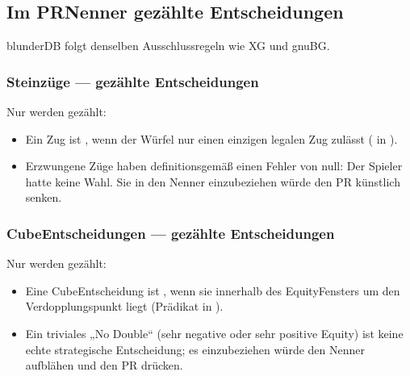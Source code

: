 \documentclass[letterpaper,10pt,german]{sphinxmanual}
\begin{document}
\subsection{Im PR\sphinxhyphen{}Nenner gezählte Entscheidungen}
\label{\detokenize{stats_parity:decisions-comptees-au-denominateur-du-pr}}
\sphinxAtStartPar
blunderDB folgt denselben Ausschlussregeln wie XG und gnuBG.


\subsubsection{Steinzüge — gezählte Entscheidungen}
\label{\detokenize{stats_parity:coups-de-pions-decisions-comptees}}
\sphinxAtStartPar
Nur  werden gezählt:
\begin{itemize}
\item {} 
\sphinxAtStartPar
Ein Zug ist , wenn der Würfel nur einen einzigen legalen Zug zulässt ( in ).

\item {} 
\sphinxAtStartPar
Erzwungene Züge haben definitionsgemäß einen Fehler von null: Der Spieler hatte keine Wahl. Sie in den Nenner einzubeziehen würde den PR künstlich senken.

\end{itemize}


\subsubsection{Cube\sphinxhyphen{}Entscheidungen — gezählte Entscheidungen}
\label{\detokenize{stats_parity:decisions-de-cube-decisions-comptees}}
\sphinxAtStartPar
Nur  werden gezählt:
\begin{itemize}
\item {} 
\sphinxAtStartPar
Eine Cube\sphinxhyphen{}Entscheidung ist , wenn sie innerhalb des Equity\sphinxhyphen{}Fensters \sphinxcode{\sphinxupquote{{[}\sphinxhyphen{}0.16, +0.16{]}}} um den Verdopplungspunkt liegt (Prädikat  in ).

\item {} 
\sphinxAtStartPar
Ein triviales „No Double“ (sehr negative oder sehr positive Equity) ist keine echte strategische Entscheidung; es einzubeziehen würde den Nenner aufblähen und den PR drücken.

\end{itemize}
\end{document}
